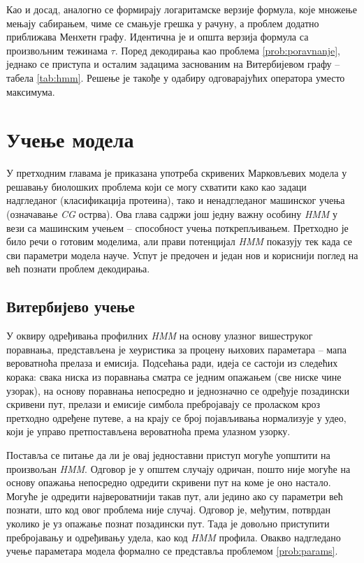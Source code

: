 \documentclass[12pt,oneside]{memoir}
\begin{document}
\begin{CJK}{UTF8}{ipxm}
Као и досад, аналогно се формирају логаритамске верзије формула, које множење мењају сабирањем, чиме се смањује грешка у рачуну, а проблем додатно приближава Менхетн графу. Идентична је и општа верзија формула са произвољним тежинама $\tau$. Поред декодирања као проблема \ref{prob:poravnanje}, једнако се приступа и осталим задацима заснованим на Витербијевом графу -- табела \ref{tab:hmm}. Решење је такође у одабиру одговарајућих оператора уместо максимума.

\chapter{Учење модела}
У претходним главама је приказана употреба скривених Марковљевих модела у решавању биолошких проблема који се могу схватити како као задаци надгледаног (класификација протеина), тако и ненадгледаног машинског учења (означавање \textit{CG} острва). Ова глава садржи још једну важну особину \textit{HMM} у вези са машинским учењем -- способност учења поткрепљивањем. Претходно је било речи о готовим моделима, али прави потенцијал \textit{HMM} показују тек када се сви параметри модела науче. Успут је предочен и један нов и кориснији поглед на већ познати проблем декодирања.

\section{Витербијево учење}
У оквиру одређивања профилних \textit{HMM} на основу улазног вишеструког поравнања, представљена је хеуристика за процену њихових параметара -- мапа вероватноћа прелаза и емисија. Подсећања ради, идеја се састоји из следећих корака: свака ниска из поравнања сматра се једним опажањем (све ниске чине узорак), на основу поравнања непосредно и једнозначно се одређује позадински скривени пут, прелази и емисије симбола пребројавају се проласком кроз претходно одређене путеве, а на крају се број појављивања нормализује у удео, који је управо претпостављена вероватноћа према улазном узорку.

Поставља се питање да ли је овај једноставни приступ могуће уопштити на произвољан \textit{HMM}. Одговор је у општем случају одричан, пошто није могуће на основу опажања непосредно одредити скривени пут на коме је оно настало. Могуће је одредити највероватнији такав пут, али једино ако су параметри већ познати, што код овог проблема није случај. Одговор је, међутим, потврдан уколико је уз опажање познат позадински пут. Тада је довољно приступити пребројавању и одређивању удела, као код \textit{HMM} профила. Овакво надгледано учење параметара модела формално се представља проблемом \ref{prob:params}.


\end{CJK}
\end{document}
